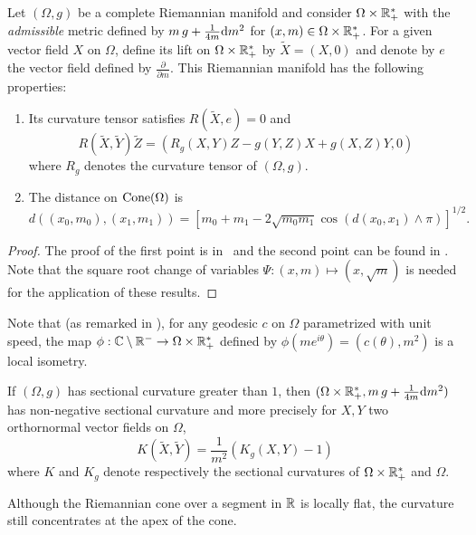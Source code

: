 \begin{proposition}\label{RiemannianMetric}
Let  $(\Omega,g)$ be a complete Riemannian manifold and consider $\Omega \times \mathbb{R}_+^*$ with the \textit{admissible} metric defined by $ m \, g + \frac{1}{4 m} \mathrm{d} m^2$ for $(x,m) \in \Omega \times \mathbb{R}_+^*$. For a given vector field $X$ on $\Omega$, define its lift on $\Omega \times \mathbb{R}_+^*$ by $\tilde{X}= (X,0)$ and denote by $e$ the vector field defined by $\frac{\partial}{\partial m}$.
This Riemannian manifold has the following properties:
\begin{enumerate}
\item Its curvature tensor satisfies $R(\tilde{X},e) = 0$ and 
\begin{equation}
R(\tilde{X},\tilde{Y})\tilde{Z} = (R_g(X,Y)Z - g(Y,Z)X + g(X,Z)Y,0)
\end{equation} where $R_g$ denotes the curvature tensor of $(\Omega,g)$.
\item The distance on $\operatorname{Cone}(\Omega)$ is 
\begin{equation}
d\left((x_0,m_0),(x_1,m_1)\right) = \left[ m_0 + m_1 -2\sqrt{m_0 m_1} \cos \left(d(x_0,x_1) \wedge \pi \right) \right]^{1/2}.
\end{equation}
\end{enumerate}
\end{proposition}

\begin{proof}
The proof of the first point is in~\cite{Gallot1979} and the second point can be found in \cite{MetricGeometryBurago}. Note that the square root change of variables $\Psi: (x,m) \mapsto (x,\sqrt{m})$ is needed for the application of these results.
\end{proof}


Note that (as remarked in \cite{Gallot1979}), for any geodesic $c$ on $\Omega$ parametrized with unit speed, the map $\phi: \mathbb{C} \setminus \mathbb{R}^- \to \Omega \times \mathbb{R}_+^*$ defined by $\phi(m e^{i\theta}) = (c(\theta),m^2)$ is a local isometry. 
\begin{corollary}
If $(\Omega,g)$ has sectional curvature greater than $1$, then $(\Omega \times \mathbb{R}_+^*, m \, g + \frac{1}{4 m} \mathrm{d} m^2)$ has non-negative sectional curvature and more precisely for $X,Y$ two orthornormal vector fields on $\Omega$,
\begin{equation}
K(\tilde{X},\tilde{Y}) =  \frac{1}{m^2}(K_g(X,Y) - 1)
\end{equation}
where $K$ and $K_g$ denote respectively the sectional curvatures of $\Omega \times \mathbb{R}_+^*$ and $\Omega$.
\end{corollary}
Although the Riemannian cone over a segment in $\mathbb{R}$ is locally flat, the curvature still concentrates at the apex of the cone.

